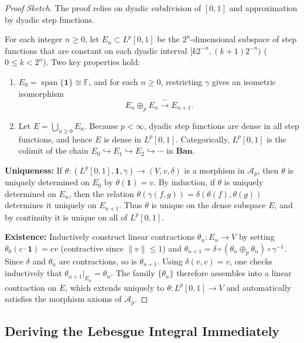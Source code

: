 \begin{proof}[Proof Sketch]
The proof relies on dyadic subdivision of $[0,1]$ and approximation by dyadic step functions.

For each integer $n \ge 0$, let $E_n \subset L^p[0,1]$ be the $2^n$-dimensional subspace of step functions that are constant on each dyadic interval $[k 2^{-n}, (k+1) 2^{-n})$ ($0 \le k < 2^n$). Two key properties hold:
\begin{enumerate}
    \item $E_0 = \operatorname{span}\{\mathbf{1}\} \cong \mathbb{F}$, and for each $n \ge 0$, restricting $\gamma$ gives an isometric isomorphism
    \[
        E_n \oplus_p E_n \xrightarrow{\ \sim\ } E_{n+1}.
    \]
    \item Let $E = \bigcup_{n \ge 0} E_n$. Because $p < \infty$, dyadic step functions are dense in all step functions, and hence $E$ is dense in $L^p[0,1]$. Categorically, $L^p[0,1]$ is the colimit of the chain $E_0 \hookrightarrow E_1 \hookrightarrow E_2 \hookrightarrow \cdots$ in $\mathbf{Ban}$.
\end{enumerate}

\textbf{Uniqueness:} If $\theta : (L^p[0,1], \mathbf{1}, \gamma) \to (V, v, \delta)$ is a morphism in $\mathcal{A}_p$, then $\theta$ is uniquely determined on $E_0$ by $\theta(\mathbf{1}) = v$. By induction, if $\theta$ is uniquely determined on $E_n$, then the relation $\theta(\gamma(f, g)) = \delta(\theta(f), \theta(g))$ determines it uniquely on $E_{n+1}$. Thus $\theta$ is unique on the dense subspace $E$, and by continuity it is unique on all of $L^p[0,1]$.

\textbf{Existence:} Inductively construct linear contractions $\theta_n : E_n \to V$ by setting $\theta_0(c \cdot \mathbf{1}) = c v$ (contractive since $\|v\| \le 1$) and $\theta_{n+1} = \delta \circ (\theta_n \oplus_p \theta_n) \circ \gamma^{-1}$. Since $\delta$ and $\theta_n$ are contractions, so is $\theta_{n+1}$. Using $\delta(v, v) = v$, one checks inductively that $\theta_{n+1}|_{E_n} = \theta_n$. The family $\{\theta_n\}$ therefore assembles into a linear contraction on $E$, which extends uniquely to $\theta : L^p[0,1] \to V$ and automatically satisfies the morphism axioms of $\mathcal{A}_p$.
\end{proof}

\subsection{Deriving the Lebesgue Integral Immediately}

